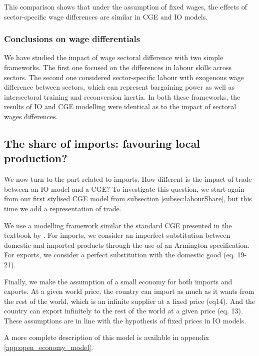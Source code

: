 This comparison shows that under the assumption of fixed wages, the effects of sector-specific wage differences are similar in CGE and IO models. 

\subsubsection{Conclusions on wage differentials}
We have studied the impact of wage sectoral difference with two simple frameworks. 
The first one focused on the differences in labour skills across sectors. 
The second one considered sector-specific labour with exogenous wage difference between sectors, which can represent bargaining power as well as intersectoral training and reconversion inertia.
In both these frameworks, the results of IO and CGE modelling were identical as to the impact of sectoral wages differences. 


\subsection{The share of imports: favouring local production?} \label{subec:importShare}
We now turn to the part related to imports. How different is the impact of trade between an IO model and a CGE?
To investigate this question, we start again from our first stylised CGE model from subsection \ref{subsec:labourShare}, but this time we add a representation of trade.

We use a modelling framework similar the standard CGE presented in the textbook by \citet{Hosoe2010}. For imports, we consider an imperfect substitution between domestic and imported products through the use of an Armington specification. For exports, we consider a perfect substitution with the domestic good
 (eq. 19-21). 

Finally, we make the assumption of a small economy for both imports and exports. At a given world price, the country can import as much as it wants from the rest of the world, which is an infinite supplier at a fixed price (eq14). And the country can export infinitely to the rest of the world at a given price (eq. 13). These assumptions are in line with the hypothesis of fixed prices in IO models.

A more complete description of this model is available in appendix \ref{app:open_economy_model}.

